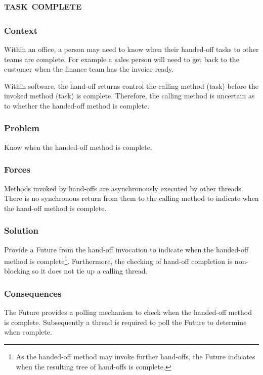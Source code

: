 \documentclass[prodmode]{style/acmlarge}
\begin{document}
\subsection{\textsc{\textbf{task complete}}}

\subsubsection*{Context} Within an office, a person may need to know when their
handed-off tasks to other teams are complete.  For example a sales person will
need to get back to the customer when the finance team has the invoice ready.

Within software, the hand-off returns control the calling method (task) before
the invoked method (task) is complete.  Therefore, the calling method is
uncertain as to whether the handed-off method is complete.

\subsubsection*{\textbf{Problem}} Know when the handed-off method is complete.

\subsubsection*{Forces} Methods invoked by hand-offs are asynchronously executed
by other threads.  There is no synchronous return from them to the calling
method to indicate when the hand-off method is complete.

\subsubsection*{\textbf{Solution}} Provide a Future from the hand-off invocation to
indicate when the handed-off method is complete\footnote{As the handed-off
method may invoke further hand-offs, the Future indicates when the resulting
tree of hand-offs is complete.}.  Furthermore, the checking of hand-off
completion is non-blocking so it does not tie up a calling thread.

\subsubsection*{Consequences} The Future provides a polling mechanism to check
when the handed-off method is complete.  Subsequently a thread is required to
poll the Future to determine when complete.
\end{document}

